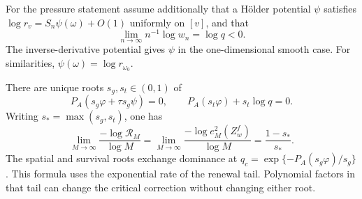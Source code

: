For the pressure statement assume additionally that a H\"older potential
$\psi$ satisfies $\log r_v=S_n\psi(\omega)+O(1)$ uniformly on $[v]$,
and that
\begin{equation}
             \lim_{n\to\infty}n^{-1}\log w_n=\log q<0.   \label{eq:v6-tail-rate}
\end{equation}
The inverse-derivative potential gives $\psi$ in the one-dimensional
smooth case. For similarities, $\psi(\omega)=\log r_{\omega_0}$.

\begin{theorem}\label{thm:v6-pressure}
There are unique roots $s_g,s_t\in(0,1)$ of
\begin{equation}
 P_A(s_g\varphi+\tau s_g\psi)=0,\qquad
 P_A(s_t\varphi)+s_t\log q=0.                             \label{eq:v6-roots}
\end{equation}
Writing $s_* =\max(s_g,s_t)$, one has
\begin{equation}
 \lim_{M\to\infty}\frac{-\log\mathcal R_M}{\log M}
 =\lim_{M\to\infty}\frac{-\log e_M^2(Z_w^f)}{\log M}
 =\frac{1-s_*}{s_*}.                                    \label{eq:v6-exponent}
\end{equation}
The spatial and survival roots exchange dominance at
$q_c=\exp\{-P_A(s_g\varphi)/s_g\}$. This formula uses the exponential
rate of the renewal tail. Polynomial factors in that tail can change
the critical correction without changing either root.
\end{theorem}
